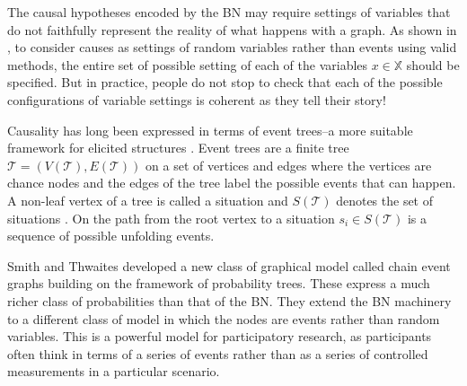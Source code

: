 \documentclass[12pt]{article}
\begin{document}
%
%
%


The causal hypotheses encoded by the BN may require settings of variables that do not faithfully represent the reality of what happens with a graph. As shown in \cite{SPIRTES}, to consider causes as settings of random variables rather than events using valid methods, the entire set of possible setting of each of the variables $x \in \mathbb{X}$ should be specified. But in practice, people do not stop to check that each of the possible configurations of variable settings is coherent as they tell their story! 

Causality has long been expressed in terms of event trees--a more suitable framework for elicited structures \cite{Shafer1996}.
Event trees are a finite tree $\mathcal{T} = (V(\mathcal{T}), E(\mathcal{T}))$ on a set of vertices and edges where the vertices are chance nodes and the edges of the tree label the possible events that can happen. A non-leaf vertex of a tree is called a situation and $S(\mathcal{T})$ denotes the set of situations \cite{Barclay2015}. On the path from the root vertex to a situation $s_i \in S(\mathcal{T})$ is a sequence of possible unfolding events.

Smith and Thwaites developed a new class of graphical model called chain event graphs building on the framework of probability trees. These express a much richer class of probabilities than that of the BN. %
They extend the BN machinery to a different class of model in which the nodes are events rather than random variables. This is a powerful model for participatory research, as participants often think in terms of a series of events rather than as a series of controlled measurements in a particular scenario. 
\end{document}
